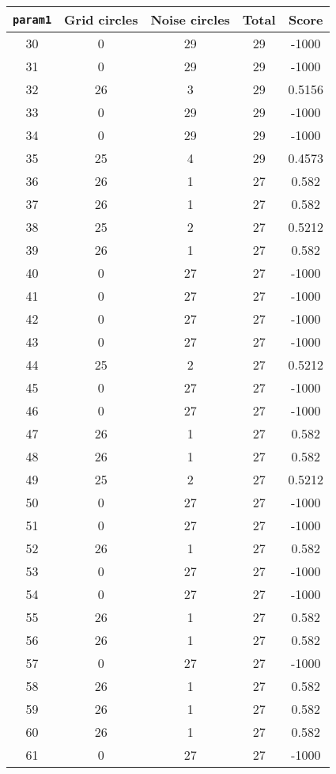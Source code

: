 \documentclass[letterpaper, 12pt]{article}
\begin{document}
\begin{longtable}{|c|c|c|c|c|}
\hline
\textbf{\texttt{param1}} & \textbf{Grid circles} & \textbf{Noise circles} & \textbf{Total} & \textbf{Score} \\
\hline
30 & 0 & 29 & 29 & -1000 \\
\hline
31 & 0 & 29 & 29 & -1000 \\
\hline
32 & 26 & 3 & 29 & 0.5156 \\
\hline
33 & 0 & 29 & 29 & -1000 \\
\hline
34 & 0 & 29 & 29 & -1000 \\
\hline
35 & 25 & 4 & 29 & 0.4573 \\
\hline
36 & 26 & 1 & 27 & 0.582 \\
\hline
37 & 26 & 1 & 27 & 0.582 \\
\hline
38 & 25 & 2 & 27 & 0.5212 \\
\hline
39 & 26 & 1 & 27 & 0.582 \\
\hline
40 & 0 & 27 & 27 & -1000 \\
\hline
41 & 0 & 27 & 27 & -1000 \\
\hline
42 & 0 & 27 & 27 & -1000 \\
\hline
43 & 0 & 27 & 27 & -1000 \\
\hline
44 & 25 & 2 & 27 & 0.5212 \\
\hline
45 & 0 & 27 & 27 & -1000 \\
\hline
46 & 0 & 27 & 27 & -1000 \\
\hline
47 & 26 & 1 & 27 & 0.582 \\
\hline
48 & 26 & 1 & 27 & 0.582 \\
\hline
49 & 25 & 2 & 27 & 0.5212 \\
\hline
50 & 0 & 27 & 27 & -1000 \\
\hline
51 & 0 & 27 & 27 & -1000 \\
\hline
52 & 26 & 1 & 27 & 0.582 \\
\hline
53 & 0 & 27 & 27 & -1000 \\
\hline
54 & 0 & 27 & 27 & -1000 \\
\hline
55 & 26 & 1 & 27 & 0.582 \\
\hline
56 & 26 & 1 & 27 & 0.582 \\
\hline
57 & 0 & 27 & 27 & -1000 \\
\hline
58 & 26 & 1 & 27 & 0.582 \\
\hline
59 & 26 & 1 & 27 & 0.582 \\
\hline
60 & 26 & 1 & 27 & 0.582 \\
\hline
61 & 0 & 27 & 27 & -1000 \\

\end{longtable}
\end{document}
